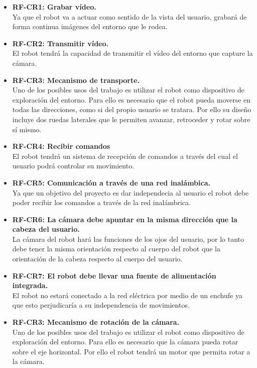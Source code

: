 \documentclass[twoside, 11pt]{epstfg}
\begin{document}
\begin{itemize}
	\item \textbf{RF-CR1: Grabar vídeo.}\\
	 Ya que el robot va a actuar como sentido de la vista del usuario, grabará de forma continua imágenes del entorno que le rodea.
	
	\item \textbf{RF-CR2: Transmitir vídeo.}\\
	El robot tendrá la capacidad de transmitir el vídeo del entorno que capture la cámara. 

	\item\textbf{RF-CR3: Mecanismo de transporte.} \\
	Uno de los posibles usos del trabajo es utilizar el robot como dispositivo de exploración del entorno. Para ello es necesario que el robot pueda moverse en todas las direcciones, como si del propio usuario se tratara. Por ello su diseño incluye dos ruedas laterales que le permiten avanzar, retroceder y rotar sobre sí mismo.
	
	
	\item\textbf{RF-CR4: Recibir comandos} \\
	El robot tendrá un sistema de recepción de comandos a través del cual el usuario podrá controlar su movimiento.
	
	
	\item\textbf{RF-CR5: Comunicación a través de una red inalámbica.}\\
	Ya que un objetivo del proyecto es dar independecia al usuario el robot debe poder recibir los comandos a través de la red inalámbrica.
	
	\item\textbf{RF-CR6: La cámara debe apuntar en la misma dirección que la cabeza del usuario.}\\
	La cámara del robot hará las funciones de los ojos del usuario, por lo tanto debe tener la misma orientación respecto al cuerpo del robot que la orientación de la cabeza respecto al cuerpo del usuario.
	
	\item \textbf{RF-CR7: El robot debe llevar una fuente de alimentación integrada.}\\
	El robot no estará conectado a la red eléctrica por medio de un enchufe ya que esto perjudicaría a su independencia de movimientos. 
	
	\item\textbf{RF-CR3: Mecanismo de rotación de la cámara.} \\
	Uno de los posibles usos del trabajo es utilizar el robot como dispositivo de exploración del entorno. Para ello es necesario que la cámara pueda rotar sobre el eje horizontal. Por ello el robot tendrá un motor que permita rotar a la cámara.
\end{itemize}
\end{document}
